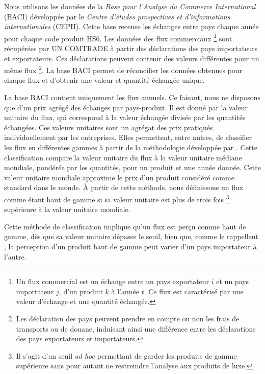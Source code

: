 \documentclass[french,10pt,a4paper]{article}
\begin{document}
Nous utilisons les données de la \textit{Base pour l'Analyse du Commerce International} (BACI) \citep{Gaulier2010} développée par le \textit{Centre d'études prospectives et d'informations internationales} (CEPII). Cette base recense les échanges entre pays chaque année pour chaque code produit HS6. Les données des flux commerciaux \footnote{Un flux commercial est un échange entre un pays exportateur $i$ et un pays importateur $j$, d'un produit $k$ à l'année $t$. Ce flux est caractérisé par une valeur d'échange et une quantité échangée.} sont récupérées par UN COMTRADE à partir des déclarations des pays importateurs et exportateurs. Ces déclarations peuvent contenir des valeurs différentes pour un même flux \footnote{Les déclaration des pays peuvent prendre en compte ou non les frais de transports ou de douane, induisant ainsi une différence entre les déclarations des pays exportateurs et importateurs.}. La base BACI permet de réconcilier les données obtenues pour chaque flux et d'obtenir une valeur et quantité échangée unique.

La base BACI contient uniquement les flux annuels. Ce faisant, nous ne disposons que d'un prix agrégé des échanges par pays-produit. Il est donné par la valeur unitaire du flux, qui correspond à la valeur échangée divisée par les quantités échangées. Ces valeurs unitaires sont un agrégat des prix pratiqués individuellement par les entreprises. Elles permettent, entre autres, de classifier les flux en différentes gammes à partir de la méthodologie développée par \cite{Fontagne1997}. Cette classification compare la valeur unitaire du flux à la valeur unitaire médiane mondiale, pondérée par les quantités, pour un produit et une année donnée. Cette valeur unitaire mondiale approxime le prix d'un produit considéré comme standard dans le monde. À partir de cette méthode, nous définissons un flux comme étant haut de gamme si sa valeur unitaire est plus de trois fois \footnote{Il s'agit d'un seuil \textit{ad hoc} permettant de garder les produits de gamme supérieure sans pour autant ne restreindre l'analyse aux produits de luxe.} supérieure à la valeur unitaire mondiale.

Cette méthode de classification implique qu'un flux est perçu comme haut de gamme, dès que sa valeur unitaire dépasse le seuil, bien que, comme le rappellent \cite{Martin2015}, la perception d'un produit haut de gamme peut varier d'un pays importateur à l'autre.

\bigskip
\end{document}
